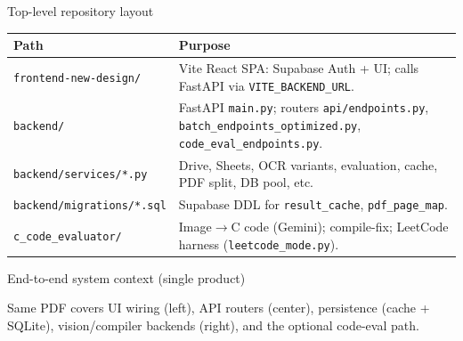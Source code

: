 \documentclass[aspectratio=169]{beamer}
\begin{document}
\begin{frame}{Top-level repository layout}
  \footnotesize
  \begin{tabular}{@{}p{4.2cm}p{9.4cm}@{}}
    \toprule
    Path & Purpose \\
    \midrule
    \texttt{frontend-new-design/} & Vite React SPA: Supabase Auth + UI; calls FastAPI via \texttt{VITE\_BACKEND\_URL}. \\
    \texttt{backend/} & FastAPI \texttt{main.py}; routers \texttt{api/endpoints.py}, \texttt{batch\_endpoints\_optimized.py}, \texttt{code\_eval\_endpoints.py}. \\
    \texttt{backend/services/*.py} & Drive, Sheets, OCR variants, evaluation, cache, PDF split, DB pool, etc. \\
    \texttt{backend/migrations/*.sql} & Supabase DDL for \texttt{result\_cache}, \texttt{pdf\_page\_map}. \\
    \texttt{c\_code\_evaluator/} & Image$\rightarrow$C code (Gemini); compile-fix; LeetCode harness (\texttt{leetcode\_mode.py}). \\
    \bottomrule
  \end{tabular}
\end{frame}

\begin{frame}{End-to-end system context (single product)}
  \centering

  \vspace{0.6em}
  \footnotesize
  Same PDF covers UI wiring (left), API routers (center), persistence (cache + SQLite), vision/compiler backends (right), and the optional code-eval path.
\end{frame}
\end{document}
